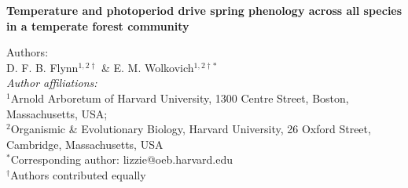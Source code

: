 \documentclass[11pt]{article}
\begin{document}
 
  
\textbf{\large{Temperature and photoperiod drive spring phenology across all species in a temperate forest community}}

Authors:\\
D. F. B. Flynn$^{1,2\dagger}$ \& E. M. Wolkovich$^{1,2\dagger *}$
\vspace{2ex}\\
\emph{Author affiliations:}\\
$^{1}$Arnold Arboretum of Harvard University, 1300 Centre Street, Boston, Massachusetts, USA; \\
$^{2}$Organismic \& Evolutionary Biology, Harvard University, 26 Oxford Street, Cambridge, Massachusetts, USA
\vspace{2ex}\\
$^*$Corresponding author: lizzie@oeb.harvard.edu\\
$^\dagger$Authors contributed equally



\end{document}
